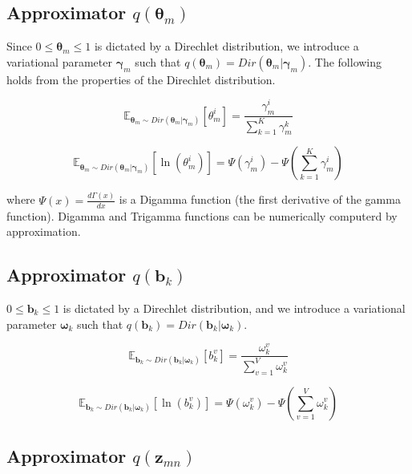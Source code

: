\documentclass[a4]{article}
\begin{document}
\subsection{Approximator $q( \bm{\theta}_m )$}\label{approximator_theta_m}

Since $0 \le \bm{\theta}_m \le 1$ is dictated by a Direchlet distribution,
we introduce a variational parameter $\bm{\gamma}_{m}$ such that 
$ q( \bm{\theta}_m ) = Dir( \bm{\theta}_m | \bm{\gamma}_{m} ) $.
The following holds from the properties of the Direchlet distribution.

\begin{equation}
    \mathbb{E}_{\bm{\theta}_m \sim Dir( \bm{\theta}_m | \bm{\gamma}_{m})}
        [\theta_m^i] = \frac{ \gamma_{m}^i }{ \sum_{k=1}^{K} \gamma_{m}^k }
\end{equation}

\begin{equation}
    \mathbb{E}_{ \bm{\theta}_m \sim Dir( \bm{\theta}_m | \bm{\gamma}_{m}) }
        [\ln(\theta_m^i)] =
            \Psi( \gamma_{m}^i ) - \Psi( \sum_{k=1}^{K} \gamma_{m}^i )
\end{equation}

where $\Psi(x) = \frac{d\Gamma(x)}{dx}$ is a Digamma function 
(the first derivative of the gamma function).
Digamma and Trigamma functions can be numerically computerd by approximation.


\subsection{Approximator $q( \mathbf{b}_k )$}

$0 \le \mathbf{b}_k \le 1$  is dictated by a Direchlet
distribution, and we introduce a variational parameter $\bm{\omega}_k$
such that $ q( \mathbf{b}_k ) = Dir( \mathbf{b}_k | \bm{\omega}_{k} ) $.

\begin{equation}
    \mathbb{E}_{\mathbf{b}_k \sim Dir( \mathbf{b}_k | \bm{\omega}_{k})}
        [b_k^v] = \frac{ \omega_{k}^v }{ \sum_{v=1}^{V} \omega_{k}^v }
\end{equation}

\begin{equation}
    \mathbb{E}_{ \mathbf{b}_k \sim Dir( \mathbf{b}_k | \bm{\omega}_{k}) }
        [\ln(b_k^v)] =
            \Psi( \omega_{k}^v ) - \Psi( \sum_{v=1}^{V} \omega_{k}^v )
\end{equation}

\subsection{Approximator $q( \mathbf{z}_{mn})$}
\end{document}
